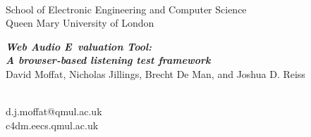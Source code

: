 
\begin{center}
\colorbox{qmuldarkblue}
{
 \color{white}

 \parbox{1.0\textwidth}
 {
  \parbox{0.2\textwidth}
  {
   \begin{center}
   \\[1ex]
   \textrm
   {
    \footnotesize
    School of Electronic Engineering and Computer Science\\
    Queen Mary University of London\\
   }
   \end{center}
  }
  \parbox{0.58\textwidth}
  {
   \vspace{1cm}
   \begin{center}
   \textrm
   {
    {\veryHuge \bf \em Web Audio E valuation Tool:\\ A browser-based listening test framework}\\[1ex]
    {\Large       David Moffat, Nicholas Jillings, Brecht De Man, and Joshua D. Reiss}
   }    
   \end{center}
   \vspace{1cm}
  }
  \parbox{0.2\textwidth}
  {
   \begin{center}
   \\[1ex]
   \textrm
   {
    \small
   d.j.moffat@qmul.ac.uk\\
    c4dm.eecs.qmul.ac.uk\\
   }
   \end{center}
  }
 }
}
\end{center}
